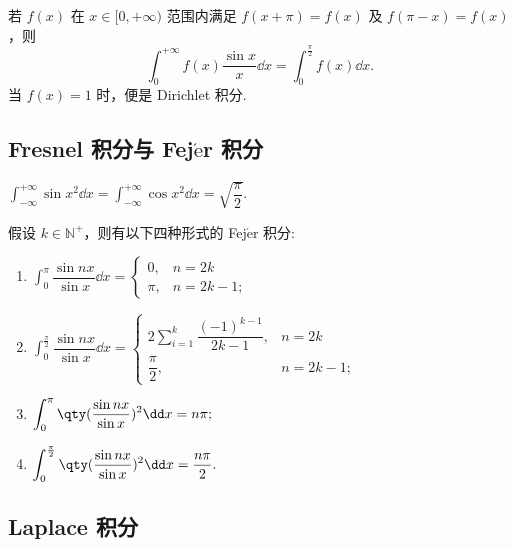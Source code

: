 \begin{theorem}
    若 $f(x)$ 在 $x\in[0,+\infty)$ 范围内满足 $f(x+\pi)=f(x)$ 及 $f(\pi-x)=f(x)$，则
    $$\int_{0}^{+\infty}f(x)\dfrac{\sin x}{x}\dd x=\int_{0}^{\frac{\pi}{2}}f(x)\dd x.$$
    当 $f(x)=1$ 时，便是 Dirichlet 积分.
\end{theorem}

\subsection{Fresnel 积分与 Fej\texorpdfstring{$\acute{\text{e}}$}.r 积分}

\begin{theorem}
    $\displaystyle\int_{-\infty}^{+\infty}\sin x^2\dd x=\int_{-\infty}^{+\infty}\cos x^2\dd x=\sqrt{\dfrac{\pi}{2}}.$
\end{theorem}

\begin{theorem}
    假设 $k\in\mathbb{N}^+$，则有以下四种形式的 Fej$\acute{\text{e}}$r 积分:
    \begin{enumerate}[label=(\arabic{*})]
        \item $\displaystyle \int_{0}^{\pi}\dfrac{\sin nx}{\sin x}\dd x=\begin{cases}
                      0,   & n=2k    \\
                      \pi, & n=2k-1;
                  \end{cases}$
        \item $\displaystyle\int_{0}^{\frac{\pi}{2}}\dfrac{\sin nx}{\sin x}\dd x=\begin{cases}
                      2\displaystyle\sum_{i=1}^{k}\dfrac{(-1)^{k-1}}{2k-1}, & n=2k    \\[6pt]
                      \dfrac{\pi}{2},                                       & n=2k-1;
                  \end{cases}$
        \item $\displaystyle \int_{0}^{\pi}\qty(\dfrac{\sin nx}{\sin x})^2\dd x=n\pi;$
        \item $\displaystyle\int_{0}^{\frac{\pi}{2}}\qty(\dfrac{\sin nx}{\sin x})^2\dd x=\dfrac{n\pi  }{2}.$
    \end{enumerate}
\end{theorem}

\subsection{Laplace 积分}

